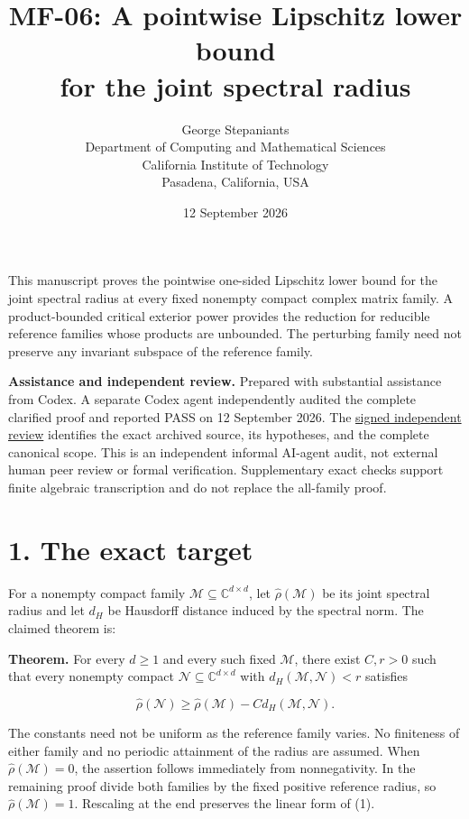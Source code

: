 \documentclass[11pt,a4paper]{article}
\title{\textbf{MF-06: A pointwise Lipschitz lower bound\\for the joint spectral radius}}
\author{George Stepaniants\\[3pt]\small Department of Computing and Mathematical Sciences\\\small California Institute of Technology\\\small Pasadena, California, USA}
\date{12 September 2026}
\begin{document}
\maketitle
This manuscript proves the pointwise one-sided Lipschitz lower bound for the joint spectral radius at every fixed nonempty compact complex matrix family. A product-bounded critical exterior power provides the reduction for reducible reference families whose products are unbounded. The perturbing family need not preserve any invariant subspace of the reference family.

\textbf{Assistance and independent review.} Prepared with substantial assistance from Codex. A separate Codex agent independently audited the complete clarified proof and reported PASS on 12 September 2026. The \href{../../references/stepaniants-mf06-2026-09-12/REVIEW.md}{signed independent review} identifies the exact archived source, its hypotheses, and the complete canonical scope. This is an independent informal AI-agent audit, not external human peer review or formal verification. Supplementary exact checks support finite algebraic transcription and do not replace the all-family proof.

\section{1. The exact target}\label{the-exact-target}

For a nonempty compact family \(\mathcal M\subseteq\mathbb C^{d\times d}\), let \(\widehat\rho(\mathcal M)\) be its joint spectral radius and let \(d_H\) be Hausdorff distance induced by the spectral norm. The claimed theorem is:

\textbf{Theorem.} For every \(d\ge1\) and every such fixed \(\mathcal M\), there exist \(C,r>0\) such that every nonempty compact \(\mathcal N\subseteq\mathbb C^{d\times d}\) with \(d_H(\mathcal M,\mathcal N)<r\) satisfies

\[
\widehat\rho(\mathcal N)\ge\widehat\rho(\mathcal M)-C d_H(\mathcal M,\mathcal N).
\tag{1}
\]

The constants need not be uniform as the reference family varies. No finiteness of either family and no periodic attainment of the radius are assumed. When \(\widehat\rho(\mathcal M)=0\), the assertion follows immediately from nonnegativity. In the remaining proof divide both families by the fixed positive reference radius, so \(\widehat\rho(\mathcal M)=1\). Rescaling at the end preserves the linear form of (1).
\end{document}

